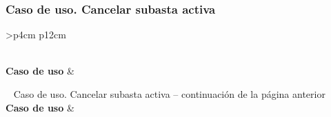 \subsubsection{Caso de uso. Cancelar subasta activa} \label{sec:cu_cancelar-subasta}
\begin{longtable}{
    >{}p{4cm}
    p{12cm}
    }
    \caption{Caso de uso. Cancelar subasta activa} \label{table:cu_cancelar-subasta} \\
    \toprule
    \textbf{Caso de uso} &  \\
    \endfirsthead
    
    {{ \tablename\ \thetable{} Caso de uso. Cancelar subasta activa -- continuación de la página anterior}} \\
    \toprule
    \textbf{Caso de uso} &  \\
    \midrule
    \endhead
    
    \midrule
     \\ 
    \endfoot
    
    \bottomrule
    \endlastfoot
    

\end{longtable}

